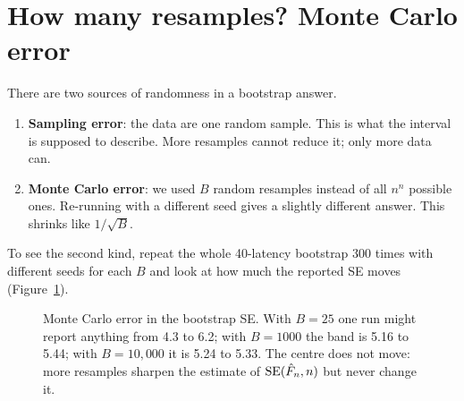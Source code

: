 \section{How many resamples? Monte Carlo error}
\label{sec:boot-B}

There are two sources of randomness in a bootstrap answer.
\begin{enumerate}
  \item \textbf{Sampling error}: the data are one random sample. This is what
  the interval is supposed to describe. More resamples cannot reduce it; only
  more data can.
  \item \textbf{Monte Carlo error}: we used $B$ random resamples instead of
  all $n^n$ possible ones. Re-running with a different seed gives a slightly
  different answer. This shrinks like $1/\sqrt{B}$.
\end{enumerate}

To see the second kind, repeat the whole 40-latency bootstrap 300 times with
different seeds for each $B$ and look at how much the reported SE moves
(Figure~\ref{fig:bootstrap-mcerror}).

\begin{figure}[H]
\centering
{}
\caption{Monte Carlo error in the bootstrap SE. With $B = 25$ one run might
report anything from 4.3 to 6.2; with $B = 1000$ the band is 5.16 to 5.44;
with $B = 10{,}000$ it is 5.24 to 5.33. The centre does not move: more
resamples sharpen the estimate of $\operatorname{SE}(\hat F_n, n)$ but never change it.}
\label{fig:bootstrap-mcerror}
\end{figure}

